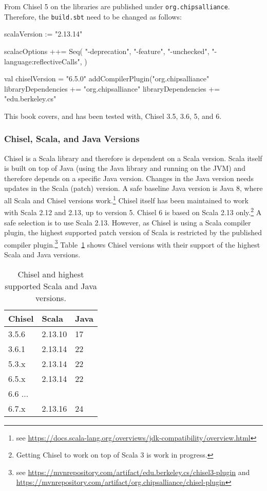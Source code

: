 \documentclass[%
    10pt,
    headinclude, footexclude,
    openright, %
    notitlepage,
    cleardoubleempty,
    headsepline,
    pointlessnumbers,
    bibtotoc, idxtotoc,
    ]{scrbook}
\newcommand{\code}[1]{{\lstinline[basicstyle=\small\ttfamily]{#1}}}
\begin{document}
From Chisel 5 on the libraries are published under \code{org.chipsalliance}.
Therefore, the \code{build.sbt} need to be changed as follows:

\begin{chisel}
scalaVersion := "2.13.14"

scalacOptions ++= Seq(
  "-deprecation",
  "-feature",
  "-unchecked",
  "-language:reflectiveCalls",
)

val chiselVersion = "6.5.0"
addCompilerPlugin("org.chipsalliance" %
libraryDependencies += "org.chipsalliance" %
libraryDependencies += "edu.berkeley.cs" %
\end{chisel}

This book covers, and has been tested with, Chisel 3.5, 3.6, 5, and 6.

\subsubsection{Chisel, Scala, and Java Versions}


Chisel is a Scala library and therefore is dependent on a Scala version.
Scala itself is built on top of Java (using the Java library and running on the JVM)
and therefore depends on a specific Java version. Changes in the Java version needs
updates in the Scala (patch) version. A safe baseline Java version is Java 8, where all Scala and
Chisel versions work.\footnote{see \url{https://docs.scala-lang.org/overviews/jdk-compatibility/overview.html}}
Chisel itself has been maintained to work with Scala 2.12 and 2.13, up to version 5.
Chisel 6 is based on Scala 2.13 only.\footnote{Getting Chisel to work on top of Scala 3 is work in progress.}
A safe selection is to use Scala 2.13. However, as Chisel is using a Scala compiler plugin,
the highest supported patch version of Scala is restricted by the published compiler
plugin.\footnote{see \url{https://mvnrepository.com/artifact/edu.berkeley.cs/chisel3-plugin}
and \url{https://mvnrepository.com/artifact/org.chipsalliance/chisel-plugin}}
Table~\ref{tab:versions} shows Chisel versions with their support of the highest
Scala and Java versions.


\begin{table}
 \centering
  \begin{tabular}{lll}
    \toprule
    Chisel & Scala & Java \\
    \midrule
    3.5.6 & 2.13.10 & 17 \\
    3.6.1 & 2.13.14 & 22 \\
    5.3.x & 2.13.14 & 22 \\
    6.5.x & 2.13.14 & 22 \\
    6.6 ... \\
    6.7.x & 2.13.16 & 24 \\
    \bottomrule
  \end{tabular}
  \caption{Chisel and highest supported Scala and Java versions.}
 \label{tab:versions}
\end{table}
\end{document}
